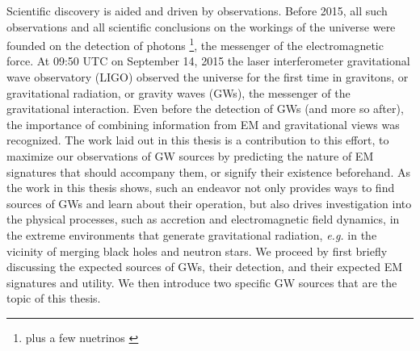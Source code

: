 Scientific discovery is aided and driven by observations. Before 2015, all such observations and all scientific conclusions on the workings of the universe were founded on the detection of photons \footnote{plus a few nuetrinos \citep{}}, the messenger of the electromagnetic force. At 09:50 UTC on September 14, 2015 the laser interferometer gravitational wave observatory (LIGO) observed the universe for the first time in gravitons, or gravitational radiation, or gravity waves (GWs), the messenger of the gravitational interaction. Even before the detection of GWs (and more so after), the importance of combining information from EM and gravitational views was recognized. The work laid out in this thesis is a contribution to this effort, to maximize our observations of GW sources by predicting the nature of EM signatures that should accompany them, or signify their existence beforehand. As the work in this thesis shows, such an endeavor not only provides ways to find sources of GWs and learn about their operation, but also drives investigation into the physical processes, such as accretion and electromagnetic field dynamics, in the extreme environments that generate gravitational radiation, \textit{e.g.} in the vicinity of merging black holes and neutron stars. We proceed by first briefly discussing the expected sources of GWs, their detection, and their expected EM signatures and utility. We then introduce two specific GW sources that are the topic of this thesis.





